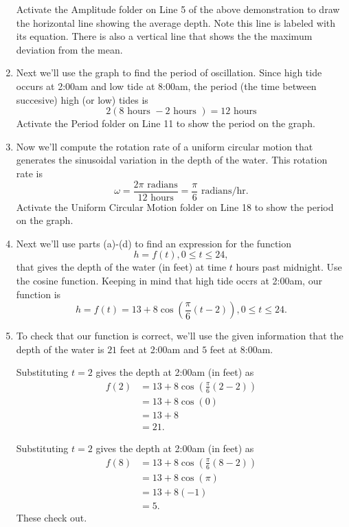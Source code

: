 \documentclass{ximera}
\begin{document}
\begin{example}
\begin{explanation}
\begin{enumerate}
Activate the Amplitude folder on Line 5 of the above demonstration to draw the horizontal line showing the average depth. Note this line is labeled with its equation. There is also a vertical line that shows the the maximum deviation from the mean.

\item Next we'll use the graph to find the period of oscillation. Since high tide occurs at 2:00am and low tide at 8:00am, the period (the time between succesive) high (or low) tides is
\[
    2(8 \text{ hours } - 2 \text{ hours }) = 12 \text{ hours}
\]
Activate the Period folder on Line 11 to show the period on the graph.

\item Now we'll compute the rotation rate of a uniform circular motion that generates the sinusoidal variation in the depth of the water. This rotation rate is
\[
  \omega = \frac{2\pi \text{ radians}}{12 \text{ hours}} = \frac{\pi}{6} \text{ radians/hr} .
\]
Activate the Uniform Circular Motion folder on Line 18 to show the period on the graph.

\item Next we'll use parts (a)-(d) to find an expression for the function 
\[
   h = f(t) ,  0\leq t \leq 24, 
\]
that gives the depth of the water (in feet) at time $t$ hours past midnight. Use the cosine function. Keeping in mind that high tide occrs at 2:00am, our function is 
\[
   h  = f(t) = 13 + 8 \cos \left(  \frac{\pi}{6} \left( t - 2 \right) \right),  0\leq t \leq 24.
\]



\item To check that our function is correct, we'll use the given information that the depth of the water is $21$ feet at 2:00am and $5$ feet at 8:00am.

Substituting $t=2$ gives the depth at 2:00am (in feet) as
\begin{align*}
   f(2)   & = 13 + 8 \cos \left(  \frac{\pi}{6} \left( 2 - 2 \right) \right) \\ 
           & = 13 + 8 \cos (0)  \\ 
           & = 13 + 8 \\
           & = 21 .
\end{align*}

Substituting $t=2$ gives the depth at 2:00am (in feet) as
\begin{align*}
   f(8)   & = 13 + 8 \cos \left(  \frac{\pi}{6} \left(8 - 2 \right) \right) \\ 
           & = 13 + 8 \cos (\pi)  \\ 
           & = 13 + 8(-1) \\
           & = 5 .
\end{align*}
These check out.


\end{enumerate}
\end{explanation}
\end{example}
\end{document}
